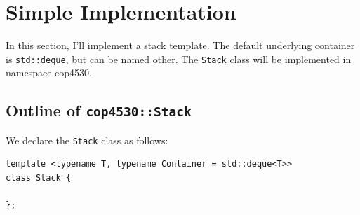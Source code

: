 \documentclass[12pt]{book}
\begin{document}
\section{Simple Implementation}
\label{sec:org065c174}
In this section, I'll implement a stack template. The default underlying container is \texttt{std::deque}, but can be named other. The \texttt{Stack} class will be implemented in namespace cop4530.
\subsection{Outline of \texttt{cop4530::Stack}}
\label{sec:org2f36295}
We declare the \texttt{Stack} class as follows:
\begin{verbatim}
template <typename T, typename Container = std::deque<T>>
class Stack {

};
\end{verbatim}
\end{document}
